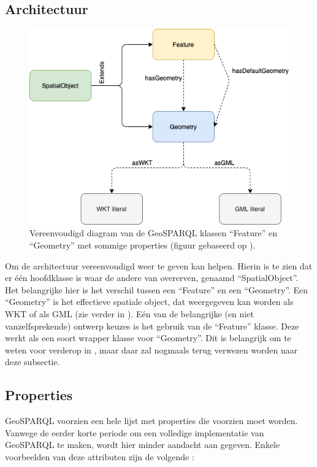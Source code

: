 \subsection{Architectuur}
\label{subsec:geosparql_architecture}
\begin{figure}[ht]
    \centering
    \includegraphics[width=0.5\linewidth]{images/geosparql_architecture.png}
    \caption{Vereenvoudigd diagram van de GeoSPARQL klassen ``Feature'' en ``Geometry'' met sommige properties (figuur gebaseerd op \cite{geosparqlsupport}).}
    \label{fig:geosparql_architecture}
\end{figure}

Om de architectuur vereenvoudigd weer te geven kan  helpen. Hierin is te zien dat er één hoofdklasse is waar de andere van overerven, genaamd ``SpatialObject''. Het belangrijke hier is het verschil tussen een ``Feature'' en een ``Geometry''. Een ``Geometry'' is het effectieve spatiale object, dat weergegeven kan worden als WKT of als GML (zie verder in ). Eén van de belangrijke (en niet vanzelfsprekende) ontwerp keuzes is het gebruik van de ``Feature'' klasse. Deze werkt als een soort wrapper klasse voor ``Geometry''. Dit is belangrijk om te weten voor verderop in , maar daar zal nogmaals terug verwezen worden naar deze subsectie.

\subsection{Properties}
\label{subsec:geosparql_properties}
GeoSPARQL voorzien een hele lijst met properties die voorzien moet worden. Vanwege de eerder korte periode om een volledige implementatie van GeoSPARQL te maken, wordt hier minder aandacht aan gegeven. Enkele voorbeelden van deze attributen zijn de volgende \cite{ogcdocs}:

